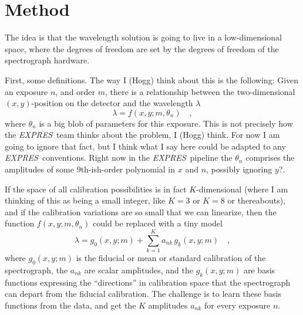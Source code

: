 \documentclass[12pt, letterpaper]{article}
\newcommand{\project}[1]{\textsl{#1}}
\newcommand{\acronym}[1]{{\small{#1}}}
\newcommand{\expres}{\project{\acronym{EXPRES}}}
\begin{document}
\section*{Method}

The idea is that the wavelength solution is going to live in a
low-dimensional space, where the degrees of freedom are set by the
degrees of freedom of the spectrograph hardware.

First, some definitions.
The way I (Hogg) think about this is the following:
Given an exposure $n$, and order $m$, there is a relationship between
the two-dimensional $(x,y)$-position on the detector and the
wavelength $\lambda$
\begin{equation}
\lambda = f(x,y;m,\theta_{n})
\quad ,
\end{equation}
where $\theta_{n}$ is a big blob of parameters for this exposure.
This is not precisely how the \expres\ team thinks about the problem,
I (Hogg) think.
For now I am going to ignore that fact, but I think what I say here
could be adapted to any \expres\ conventions.
Right now in the \expres\ pipeline the $\theta_{n}$ comprises the
amplitudes of some 9th-ish-order polynomial in $x$ and $n$, possibly
ignoring $y$?.

If the space of all calibration possibilities is in fact
$K$-dimensional (where I am thinking of this as being a small integer,
like $K=3$ or $K=8$ or thereabouts), and if the calibration variations are so
small that we can linearize, then the function $f(x,y;m,\theta_{n})$ could
be replaced with a tiny model
\begin{equation}
\lambda = g_0(x,y;m) + \sum_{k=1}^K a_{nk}\,g_k(x,y;m)
\quad ,
\end{equation}
where
$g_0(x,y;m)$ is the fiducial or mean or standard calibration of the
spectrograph,
the $a_{nk}$ are scalar amplitudes,
and the $g_k(x,y;m)$ are basis functions expressing the ``directions''
in calibration space that the spectrograph can depart from the
fiducial calibration.
The challenge is to learn these basis functions from the data, and get
the $K$ amplitudes $a_{nk}$ for every exposure $n$.
\end{document}
